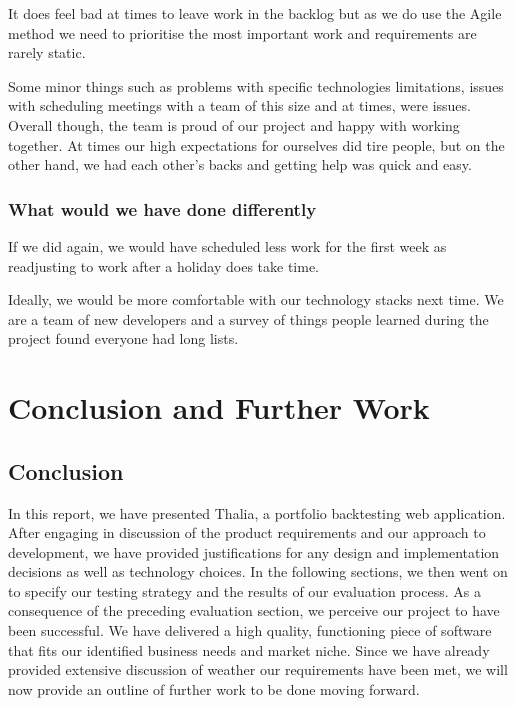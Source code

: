 \documentclass[main.tex]{subfiles}
\begin{document}
It does feel bad at times to leave work in the backlog but as we do use
the Agile method we need to prioritise the most important work and
requirements are rarely static.

Some minor things such as problems with specific technologies
limitations, issues with scheduling meetings with a team of this size
and at times, were issues. Overall though, the team is proud of our
project and happy with working together. At times our high expectations
for ourselves did tire people, but on the other hand, we had each
other's backs and getting help was quick and easy.

\subsubsection{What would we have done
differently}\label{what-would-we-have-done-differently}

If we did again, we would have scheduled less work for the first week as
readjusting to work after a holiday does take time.

Ideally, we would be more comfortable with our technology stacks next
time. We are a team of new developers and a survey of things people
learned during the project found everyone had long lists.

\section{Conclusion and Further Work}


\subsection{Conclusion}

In this report, we have presented Thalia, a portfolio backtesting web application. After engaging in discussion of the product requirements and our approach to development, we have provided justifications for any design and implementation decisions as well as technology choices. In the following sections, we then went on to specify our testing strategy and the results of our evaluation process. \newline
As a consequence of the preceding evaluation section, we perceive our project to have been successful. We have delivered a high quality, functioning piece of software that fits our identified business needs and market niche. Since we have already provided extensive discussion of weather our requirements have been met, we will now provide an outline of further work to be done moving forward.
\end{document}
